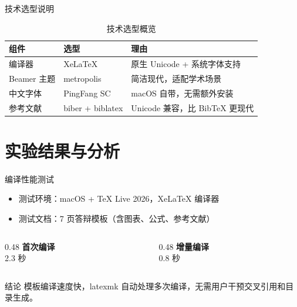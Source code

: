 \documentclass[aspectratio=169]{beamer}
\begin{document}
\begin{frame}{技术选型说明}
  \begin{table}
    \centering
    \begin{tabular}{lll}
      \toprule
      \textbf{组件} & \textbf{选型} & \textbf{理由} \\
      \midrule
      编译器   & XeLaTeX  & 原生 Unicode + 系统字体支持 \\
      Beamer 主题 & metropolis & 简洁现代，适配学术场景 \\
      中文字体 & PingFang SC & macOS 自带，无需额外安装 \\
      参考文献 & biber + biblatex & Unicode 兼容，比 BibTeX 更现代 \\
      \bottomrule
    \end{tabular}
    \caption{技术选型概览}
  \end{table}
\end{frame}

\section{实验结果与分析}

\begin{frame}{编译性能测试}
  \begin{itemize}
    \item 测试环境：macOS + TeX Live 2026，XeLaTeX 编译器
    \item 测试文档：7 页答辩模板（含图表、公式、参考文献）
  \end{itemize}

  \vspace{1em}
  \begin{columns}[T]
    \begin{column}{0.48\textwidth}
      \centering
      \textbf{首次编译} \\
      \vspace{0.3em}
      {\large 2.3 秒}
    \end{column}
    \begin{column}{0.48\textwidth}
      \centering
      \textbf{增量编译} \\
      \vspace{0.3em}
      {\large 0.8 秒}
    \end{column}
  \end{columns}

  \vspace{1em}
  \begin{block}{结论}
    模板编译速度快，latexmk 自动处理多次编译，无需用户干预交叉引用和目录生成。
  \end{block}
\end{frame}
\end{document}
